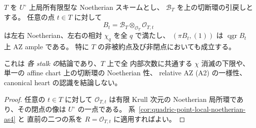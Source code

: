 \begin{corollary}
\label{cor:quadric-local-AZ-on-all-stalks}
$T$ を $U^\circ$ 上局所有限型な Noetherian スキームとし、
$\mathcal B_T$ を上の切断環の引戻しとする。
任意の点 $t\in T$ に対して
\[
 B_t=\mathcal B_T\otimes_{\mathcal O_T}
                 \mathcal O_{T,t}
\]
は左右 Noetherian、左右の相対 $\chi_q$ を全 $q$ で満たし、
$(\pi B_t,(1))$ は $\operatorname{qgr}B_t$ 上 AZ ample である。
特に $T$ の非被約点及び非閉点においても成立する。

これは \emph{各 stalk の}結論であり、$T$ 上で全
内部次数に共通する $\chi$ 消滅の下限や、
単一の affine chart 上の切断環の Noetherian 性、
relative AZ (A2) の一様性、
canonical heart の認識を結論しない。
\end{corollary}
\begin{proof}
任意の $t\in T$ に対して
$\mathcal O_{T,t}$ は有限 Krull 次元の
Noetherian 局所環であり、その閉点の像は
$U^\circ$ の一点である。
系~\ref{cor:quadric-point-local-noetherian-as4} と
直前の二つの系を
$R=\mathcal O_{T,t}$ に適用すればよい。
\end{proof}



